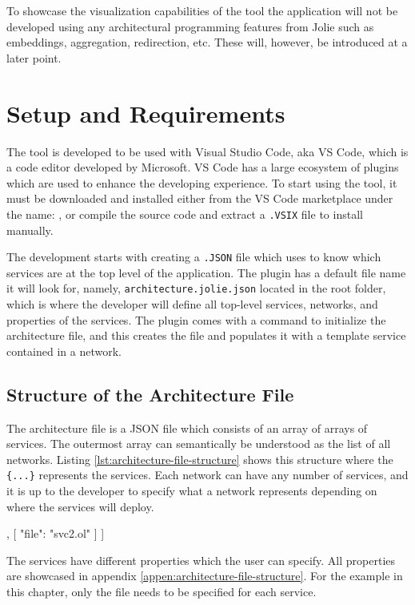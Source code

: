 To showcase the visualization capabilities of the tool the application will not be developed using any architectural programming features from Jolie such as embeddings, aggregation, redirection, etc.
These will, however, be introduced at a later point.

\section{Setup and Requirements}
The tool is developed to be used with Visual Studio Code, aka VS Code, which is a code editor developed by Microsoft.
VS Code has a large ecosystem of plugins which are used to enhance the developing experience.
To start using the tool, it must be downloaded and installed either from the VS Code marketplace under the name: \texttt{\toolname}, or compile the source code and extract a \texttt{.VSIX} file to install manually.

The development starts with creating a \texttt{.JSON} file which \toolname[] uses to know which services are at the top level of the application.
The plugin has a default file name it will look for, namely, \texttt{architecture.jolie.json} located in the root folder, which is where the developer will define all top-level services, networks, and properties of the services.
The plugin comes with a command to initialize the architecture file, and this creates the file and populates it with a template service contained in a network.

\subsection{Structure of the Architecture File}
The architecture file is a JSON file which consists of an array of arrays of services. The outermost array can semantically be understood as the list of all networks.
Listing \ref*{lst:architecture-file-structure} shows this structure where the \texttt{\{...\}} represents the services. Each network can have any number of services, and it is up to the
developer to specify what a network represents depending on where the services will deploy.

\begin{jsonlisting}[][caption={Structure of the architecture JSON file showing two networks.}, label=lst:architecture-file-structure]
[
    [
        { "file": "svc1.ol" }
    ],
    [
        { "file": "svc2.ol" }
    ]
]
\end{jsonlisting}

The services have different properties which the user can specify. All properties are showcased in appendix \ref*{appen:architecture-file-structure}.
For the example in this chapter, only the file needs to be specified for each service.

